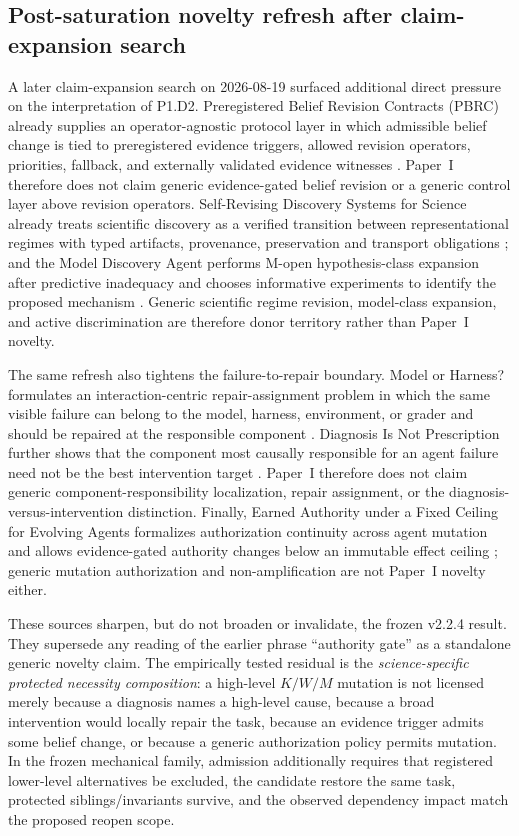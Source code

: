 \subsection{Post-saturation novelty refresh after claim-expansion search}

A later claim-expansion search on 2026-08-19 surfaced additional direct pressure on the interpretation of P1.D2. Preregistered Belief Revision Contracts (PBRC) already supplies an operator-agnostic protocol layer in which admissible belief change is tied to preregistered evidence triggers, allowed revision operators, priorities, fallback, and externally validated evidence witnesses \cite{pbrc2026}. Paper~I therefore does not claim generic evidence-gated belief revision or a generic control layer above revision operators. Self-Revising Discovery Systems for Science already treats scientific discovery as a verified transition between representational regimes with typed artifacts, provenance, preservation and transport obligations \cite{selfrevisingdiscovery2026}; and the Model Discovery Agent performs M-open hypothesis-class expansion after predictive inadequacy and chooses informative experiments to identify the proposed mechanism \cite{modeldiscoveryagent2026}. Generic scientific regime revision, model-class expansion, and active discrimination are therefore donor territory rather than Paper~I novelty.

The same refresh also tightens the failure-to-repair boundary. Model or Harness? formulates an interaction-centric repair-assignment problem in which the same visible failure can belong to the model, harness, environment, or grader and should be repaired at the responsible component \cite{modelorharness2026}. Diagnosis Is Not Prescription further shows that the component most causally responsible for an agent failure need not be the best intervention target \cite{diagnosisnotprescription2026}. Paper~I therefore does not claim generic component-responsibility localization, repair assignment, or the diagnosis-versus-intervention distinction. Finally, Earned Authority under a Fixed Ceiling for Evolving Agents formalizes authorization continuity across agent mutation and allows evidence-gated authority changes below an immutable effect ceiling \cite{earnedauthority2026}; generic mutation authorization and non-amplification are not Paper~I novelty either.

These sources sharpen, but do not broaden or invalidate, the frozen v2.2.4 result. They supersede any reading of the earlier phrase ``authority gate'' as a standalone generic novelty claim. The empirically tested residual is the \emph{science-specific protected necessity composition}: a high-level $K/W/M$ mutation is not licensed merely because a diagnosis names a high-level cause, because a broad intervention would locally repair the task, because an evidence trigger admits some belief change, or because a generic authorization policy permits mutation. In the frozen mechanical family, admission additionally requires that registered lower-level alternatives be excluded, the candidate restore the same task, protected siblings/invariants survive, and the observed dependency impact match the proposed reopen scope.

